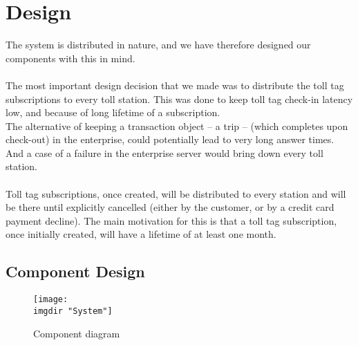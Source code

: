\chapter{Design}
\noindent
The system is distributed in nature, and we have therefore designed our components with this in mind.\\\\
The most important design decision that we made was to distribute the toll tag subscriptions to every toll station. This was done to keep toll tag check-in latency low, and because of long lifetime of a subscription.\\
The alternative of keeping a transaction object -- a trip -- (which completes upon check-out) in the enterprise, could potentially lead to very long answer times. And a case of a failure in the enterprise server would bring down every toll station.\\\\
Toll tag subscriptions, once created, will be distributed to every station and will be there until explicitly cancelled (either by the customer, or by a credit card payment decline). The main motivation for this is that a toll tag subscription, once initially created, will have a lifetime of at least one month.
\section{Component Design}

\begin{figure}
  \centering
  \texttt{[image: \\imgdir "System"]}
  \caption{Component diagram}
  \label{fig:component_diagram}
\end{figure}

